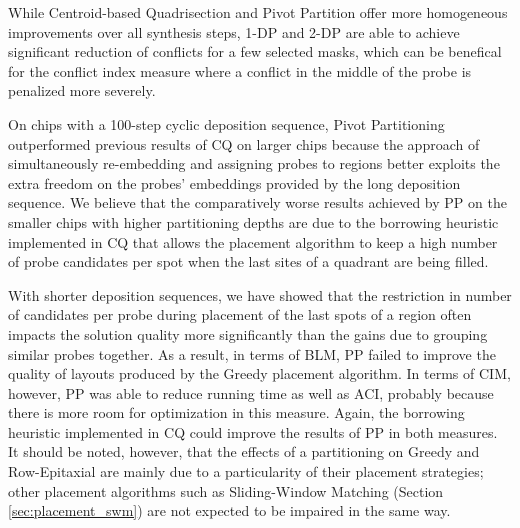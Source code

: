 While Centroid-based Quadrisection and Pivot Partition offer more homogeneous
improvements over all synthesis steps, 1-DP and 2-DP are able to achieve
significant reduction of conflicts for a few selected masks, which can be
benefical for the conflict index measure where a conflict in the middle of the
probe is penalized more severely.

On chips with a 100-step cyclic deposition sequence, Pivot Partitioning
outperformed previous results of CQ on larger chips because the approach of
simultaneously re-embedding and assigning probes to regions better exploits the
extra freedom on the probes' embeddings provided by the long deposition
sequence. We believe that the comparatively worse results achieved by PP on the
smaller chips with higher partitioning depths are due to the borrowing heuristic
implemented in CQ that allows the placement algorithm to keep a high number of
probe candidates per spot when the last sites of a quadrant are being filled.

With shorter deposition sequences, we have showed that the restriction in number
of candidates per probe during placement of the last spots of a region often
impacts the solution quality more significantly than the gains due to grouping
similar probes together. As a result, in terms of BLM, PP failed to improve the
quality of layouts produced by the Greedy placement algorithm. In terms of CIM,
however, PP was able to reduce running time as well as ACI, probably because
there is more room for optimization in this measure. Again, the borrowing
heuristic implemented in CQ could improve the results of PP in both measures. It
should be noted, however, that the effects of a partitioning on Greedy and
Row-Epitaxial are mainly due to a particularity of their placement strategies;
other placement algorithms such as Sliding-Window Matching (Section
\ref{sec:placement_swm}) are not expected to be impaired in the same way.
